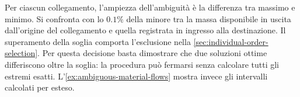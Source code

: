 Per ciascun collegamento, l'ampiezza dell'ambiguità è la differenza tra massimo e minimo. Si confronta con lo $0.1\%$ della minore tra la massa disponibile in uscita dall'origine del collegamento e quella registrata in ingresso alla destinazione. Il superamento della soglia comporta l'esclusione nella \cref{sec:individual-order-selection}. Per questa decisione basta dimostrare che due soluzioni ottime differiscono oltre la soglia: la procedura può fermarsi senza calcolare tutti gli estremi esatti. L'\cref{ex:ambiguous-material-flows} mostra invece gli intervalli calcolati per esteso.

